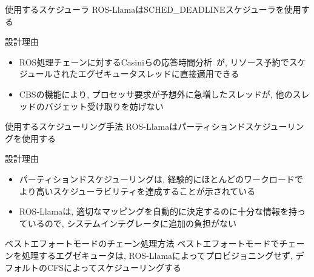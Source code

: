 \begin{frame}{使用するスケジューラ}
    ROS-LlamaはSCHED\_DEADLINEスケジューラを使用する
    \begin{block}{設計理由}
        \setlength{\linewidth}{0.98\columnwidth}
        \begin{itemize}
            \item ROS処理チェーンに対するCasiniらの応答時間分析~\cite{casini2019response}が, リソース予約でスケジュールされたエグゼキュータスレッドに直接適用できる
            \item CBSの機能により, プロセッサ要求が予想外に急増したスレッドが, 他のスレッドのバジェット受け取りを妨げない
        \end{itemize}
    \end{block}
\end{frame}

\begin{frame}{使用するスケジューリング手法}
    ROS-Llamaはパーティションドスケジューリングを使用する
    \begin{block}{設計理由}
        \setlength{\linewidth}{0.98\columnwidth}
        \begin{itemize}
            \item パーティションドスケジューリングは, 経験的にほとんどのワークロードでより高いスケジューラビリティを達成することが示されている~\cite{brandenburg2016global}
            \item ROS-Llamaは, 適切なマッピングを自動的に決定するのに十分な情報を持っているので, システムインテグレータに追加の負担がない
        \end{itemize}
    \end{block}
\end{frame}


\begin{frame}{ベストエフォートモードのチェーン処理方法}
    ベストエフォートモードでチェーンを処理するエグゼキュータは, ROS-Llamaによってプロビジョニングせず, デフォルトのCFSによってスケジューリングする
\end{frame}


